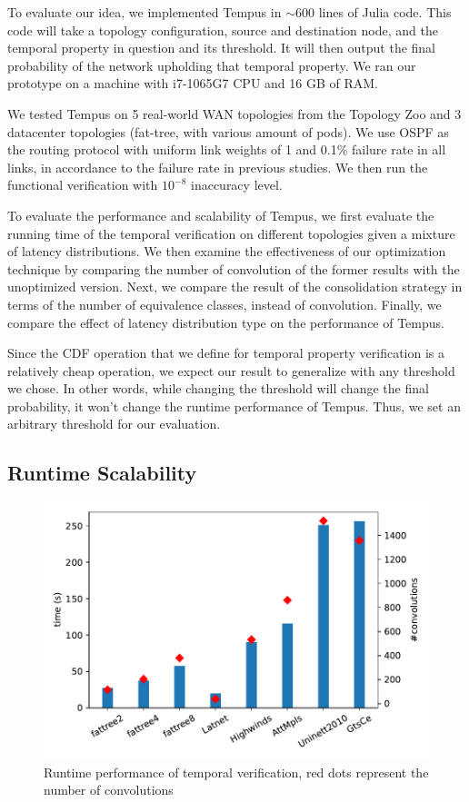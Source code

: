 \documentclass[10pt,sigconf,letterpaper,anonymous,nonacm]{acmart}
\begin{document}
To evaluate our idea, we implemented Tempus in $\sim600$ lines of Julia code.
This code will take a topology configuration, source and destination node, and the 
temporal property in question and its threshold.
It will then output the final probability of the network upholding that temporal property.
We ran our prototype on a machine with i7-1065G7 CPU and 16 GB of RAM.

We tested Tempus on 5 real-world WAN topologies from the Topology Zoo and 3 datacenter topologies 
(fat-tree, with various amount of pods).
We use OSPF as the routing protocol with uniform link weights of 1 and 0.1\% failure rate in all 
links, in accordance to the failure rate in previous studies. %
We then run the functional verification with $10^{-8}$ inaccuracy level.

To evaluate the performance and scalability of Tempus, we first evaluate the running time of the 
temporal verification on different topologies given a mixture of latency distributions. 
We then examine the effectiveness of our optimization technique by comparing the number of 
convolution of the former results with the unoptimized version.
Next, we compare the result of the consolidation strategy in terms of the number of equivalence 
classes, instead of convolution.
Finally, we compare the effect of latency distribution type on the performance of Tempus.

Since the CDF operation that we define for temporal property verification is a relatively cheap 
operation, we expect our result to generalize with any threshold we chose. 
In other words, while changing the threshold will change the final probability, it won't change 
the runtime performance of Tempus.
Thus, we set an arbitrary threshold for our evaluation.

\subsection{Runtime Scalability}

\begin{figure}[h]
    \centering
    \includegraphics[scale=0.5]{scalability}
    \caption{Runtime performance of temporal verification, red dots represent the number of convolutions}
    \label{fig:scalability}
\end{figure}
\end{document}
